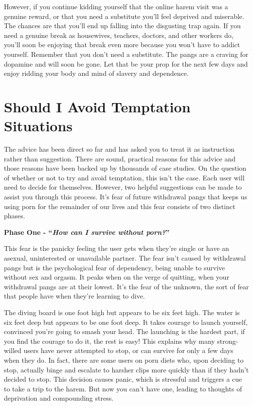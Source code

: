 \documentclass[
]{book}
\begin{document}
However, if you continue kidding yourself that the online harem visit was a genuine reward, or that you need a substitute you'll feel deprived and miserable. The chances are that you'll end up falling into the disgusting trap again. If you need a genuine break as housewives, teachers, doctors, and other workers do, you'll soon be enjoying that break even more because you won't have to addict yourself. Remember that you don't need a substitute. The pangs are a craving for dopamine and will soon be gone. Let that be your prop for the next few days and enjoy ridding your body and mind of slavery and dependence.

\hypertarget{should-i-avoid-temptation-situations}{%
\chapter{Should I Avoid Temptation Situations}\label{should-i-avoid-temptation-situations}}

The advice has been direct so far and has asked you to treat it as instruction rather than suggestion. There are sound, practical reasons for this advice and those reasons have been backed up by thousands of case studies. On the question of whether or not to try and avoid temptation, this isn't the case. Each user will need to decide for themselves. However, two helpful suggestions can be made to assist you through this process. It's fear of future withdrawal pangs that keeps us using porn for the remainder of our lives and this fear consists of two distinct phases.

\textbf{Phase One - ``\emph{How can I survive without porn?}''}

This fear is the panicky feeling the user gets when they're single or have an asexual, uninterested or unavailable partner. The fear isn't caused by withdrawal pangs but is the psychological fear of dependency, being unable to survive without sex and orgasm. It peaks when on the verge of quitting, when your withdrawal pangs are at their lowest. It's the fear of the unknown, the sort of fear that people have when they're learning to dive.

The diving board is one foot high but appears to be six feet high. The water is six feet deep but appears to be one foot deep. It takes courage to launch yourself, convinced you're going to smash your head. The launching is the hardest part, if you find the courage to do it, the rest is easy! This explains why many strong-willed users have never attempted to stop, or can survive for only a few days when they do. In fact, there are some users on porn diets who, upon deciding to stop, actually binge and escalate to harsher clips more quickly than if they hadn't decided to stop. This decision causes panic, which is stressful and triggers a cue to take a trip to the harem. But now you can't have one, leading to thoughts of deprivation and compounding stress.
\end{document}
